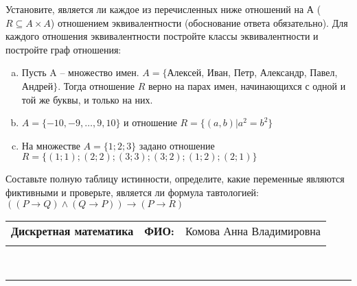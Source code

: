 \documentclass[10pt]{exam}
\newcommand{\class}{Дискретная математика}
\newcommand{\examdate}{}
\begin{document}
\begin{questions}
\question
Установите, является ли каждое из перечисленных ниже отношений на А ($R \subseteq A \times A$) отношением эквивалентности (обоснование ответа обязательно). Для каждого отношения эквивалентности постройте классы 
эквивалентности и постройте граф отношения:
\begin{enumerate} [a)]\setcounter{enumi}{0}
\item Пусть A – множество имен. $A = \{ $Алексей, Иван, Петр, Александр, Павел, Андрей$ \}$. Тогда отношение $R$ верно на парах имен, начинающихся с одной и той же буквы, и только на них.
\item $A = \{-10, -9, … , 9, 10\}$ и отношение $ R = \{(a,b)|a^{2} = b^{2}\}$
\item На множестве $A = \{1; 2; 3\}$ задано отношение $R = \{(1; 1); (2; 2); (3; 3); (3; 2); (1; 2); (2; 1)\}$
\end{enumerate}\question Составьте полную таблицу истинности, определите, какие переменные являются фиктивными и проверьте, является ли формула тавтологией:
$(( P \rightarrow Q) \land (Q \rightarrow P)) \rightarrow (P \rightarrow R)$

\end{questions}
\newpage
\begin{flushright}
\begin{tabular}{p{2.8in} r l}
\textbf{\class} & \textbf{ФИО:} &Комова Анна Владимировна
\\

\textbf{\examdate} &&\\
\end{tabular}\\
\end{flushright}
\rule[1ex]{\textwidth}{.1pt}
\end{document}
